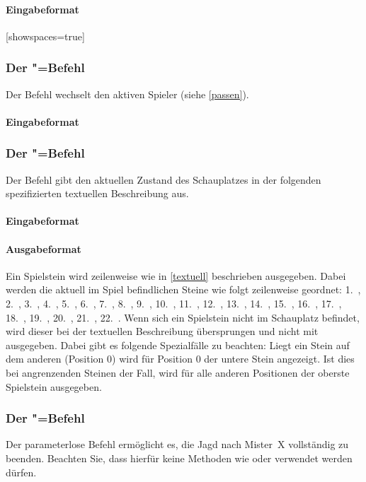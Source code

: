 \documentclass[ngerman, gray]{sdqassignment}
\begin{document}
\paragraph{Eingabeformat}[showspaces=true]

\subsubsection{Der "=Befehl}
Der Befehl wechselt den aktiven Spieler (siehe \cref{passen}).
\paragraph{Eingabeformat}

\subsubsection{Der "=Befehl}
Der Befehl gibt den aktuellen Zustand des Schauplatzes in der folgenden spezifizierten textuellen Beschreibung aus.
\paragraph{Eingabeformat}
\paragraph{Ausgabeformat} Ein Spielstein wird zeilenweise wie in \cref{textuell} beschrieben ausgegeben. Dabei werden die aktuell im Spiel befindlichen Steine wie folgt zeilenweise geordnet: 1.~, 2.~, 3.~, 4.~, 5.~, 6.~, 7.~, 8.~, 9.~, 10.~, 11.~, 12.~, 13.~, 14.~, 15.~, 16.~, 17.~, 18.~, 19.~, 20.~, 21.~, 22.~. Wenn sich ein Spielstein nicht im Schauplatz befindet, wird dieser bei der textuellen Beschreibung übersprungen und nicht mit ausgegeben. Dabei gibt es folgende Spezialfälle zu beachten: Liegt ein Stein auf dem anderen (Position 0) wird für Position 0 der untere Stein angezeigt. Ist dies bei angrenzenden Steinen der Fall, wird für alle anderen Positionen der oberste Spielstein ausgegeben. 


\subsubsection{Der "=Befehl}
Der parameterlose Befehl ermöglicht es, die Jagd nach Mister~X vollständig zu beenden. Beachten Sie, dass hierfür keine Methoden wie  oder  verwendet werden dürfen.
\end{document}
